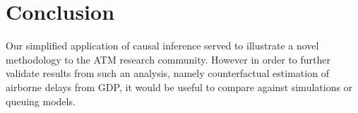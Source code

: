 \documentclass[conference]{IEEEtran}
\begin{document}






% 

\section{Conclusion}
Our simplified application of causal inference served to illustrate a novel methodology to the ATM research community.  However in order to further validate results from such an analysis, namely counterfactual estimation of airborne delays from GDP, it would be useful to compare against simulations or queuing models.    
\end{document}
